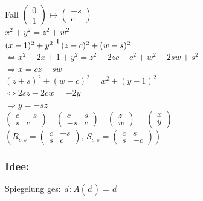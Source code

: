Fall $\begin{pmatrix} 0 \\ 1 \end{pmatrix} \mapsto \begin{pmatrix} -s \\ c \end{pmatrix}$\\
$x^{2}+y^{2} = z^{2} + w^{2}$\\
$(x-1)^{2} + y^{2} \mathop{=}\limits^{\text{\RM{1}}} ( z-c)^{2} + (w-s)^{2}$\\
$\Leftrightarrow x^{2}-2x+1+y^{2} = z^{2}-2zc+c^{2}+w^{2}-2sw+s^{2}$\\
$\Rightarrow x= cz + sw$\\
$(z+s)^{2} + (w-c)^{2} = x^{2}+(y-1)^{2}$\\
$\Leftrightarrow 2sz-2cw = -2y$\\
$\Rightarrow y = -sz$\\
$\begin{pmatrix} c & -s \\ s & c \end{pmatrix} \quad \begin{pmatrix} c & s \\ -s & c \end{pmatrix} \quad \begin{pmatrix} z \\ w \end{pmatrix} = \begin{pmatrix} x \\ y \end{pmatrix}$ \\
$(R_{c,s} = \begin{pmatrix} c & -s \\ s & c \end{pmatrix}, \, S_{c,s} = \begin{pmatrix} c & s \\ s & -c \end{pmatrix})$\\
%
%
%
\subsubsection{Idee:}
Spiegelung ges: $\vec{a}: A(\vec{a})=\vec{a}$
%
%
%
